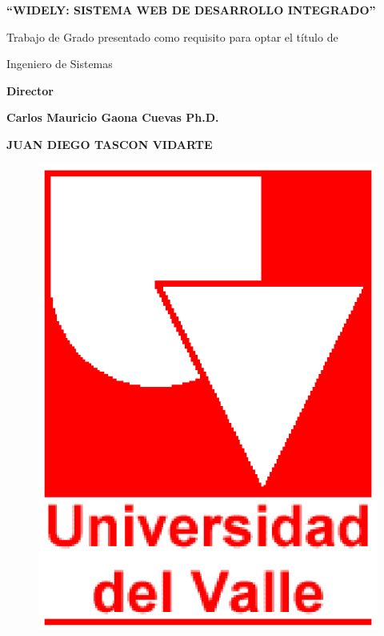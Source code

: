 \newpage


\begin{center} \textbf{\newline\newline} \end{center}
\begin{center} \textbf{``WIDELY: SISTEMA WEB DE DESARROLLO INTEGRADO''} \end{center}

\vspace{5em}

\begin{center} Trabajo de Grado presentado como requisito para optar el título de\end{center}
\begin{center} Ingeniero de Sistemas \end{center}

\vspace{1em}

\begin{center} \textbf{ Director } \end{center}
\begin{center} \textbf{ Carlos Mauricio Gaona Cuevas Ph.D. } \end{center}

\vspace{5em}

\begin{center} \textbf{JUAN DIEGO TASCON VIDARTE} \end{center}

\vspace{3em}


\begin{figure}[h]
	\centering
	\includegraphics[scale=0.3]{./img/uvlogo}
	\label{diagrama:uvlogo}
\end{figure}

